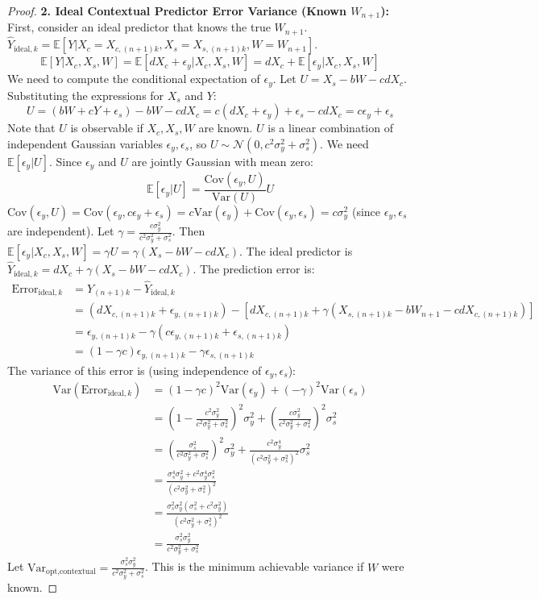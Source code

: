 \documentclass{article}
\theoremstyle{plain}
\theoremstyle{definition}
\theoremstyle{remark}
\newcommand{\E}{\mathbb{E}}
\newcommand{\Var}{\text{Var}}
\newcommand{\Cov}{\text{Cov}}
\newcommand{\N}{\mathcal{N}} %
\begin{document}
\begin{proof}
\textbf{2. Ideal Contextual Predictor Error Variance (Known $W_{n+1}$):}
First, consider an ideal predictor that knows the true $W_{n+1}$.
$\hat{Y}_{\text{ideal}, k} = \E[Y | X_c=X_{c,(n+1)k}, X_s=X_{s,(n+1)k}, W=W_{n+1}]$.
\[
\E[Y | X_c, X_s, W] = \E[dX_c + \epsilon_y | X_c, X_s, W] = dX_c + \E[\epsilon_y | X_c, X_s, W]
\]
We need to compute the conditional expectation of $\epsilon_y$. Let $U = X_s - bW - cdX_c$. Substituting the expressions for $X_s$ and $Y$:
\[
U = (bW + cY + \epsilon_s) - bW - cdX_c = c(dX_c + \epsilon_y) + \epsilon_s - cdX_c = c\epsilon_y + \epsilon_s
\]
Note that $U$ is observable if $X_c, X_s, W$ are known. $U$ is a linear combination of independent Gaussian variables $\epsilon_y, \epsilon_s$, so $U \sim \N(0, c^2\sigma_y^2 + \sigma_s^2)$.
We need $\E[\epsilon_y | U]$. Since $\epsilon_y$ and $U$ are jointly Gaussian with mean zero:
\[
\E[\epsilon_y | U] = \frac{\Cov(\epsilon_y, U)}{\Var(U)} U
\]
$\Cov(\epsilon_y, U) = \Cov(\epsilon_y, c\epsilon_y + \epsilon_s) = c\Var(\epsilon_y) + \Cov(\epsilon_y, \epsilon_s) = c\sigma_y^2$ (since $\epsilon_y, \epsilon_s$ are independent).
Let $\gamma = \frac{c\sigma_y^2}{c^2\sigma_y^2 + \sigma_s^2}$. Then $\E[\epsilon_y | X_c, X_s, W] = \gamma U = \gamma (X_s - bW - cdX_c)$.
The ideal predictor is $\hat{Y}_{\text{ideal}, k} = dX_c + \gamma (X_s - bW - cdX_c)$.
The prediction error is:
\begin{align*}
\text{Error}_{\text{ideal}, k} &= Y_{(n+1)k} - \hat{Y}_{\text{ideal}, k} \\
&= (dX_{c,(n+1)k} + \epsilon_{y,(n+1)k}) - [dX_{c,(n+1)k} + \gamma (X_{s,(n+1)k} - bW_{n+1} - cdX_{c,(n+1)k})] \\
&= \epsilon_{y,(n+1)k} - \gamma (c\epsilon_{y,(n+1)k} + \epsilon_{s,(n+1)k}) \\
&= (1 - \gamma c)\epsilon_{y,(n+1)k} - \gamma \epsilon_{s,(n+1)k}
\end{align*}
The variance of this error is (using independence of $\epsilon_y, \epsilon_s$):
\begin{align*}
\Var(\text{Error}_{\text{ideal}, k}) &= (1 - \gamma c)^2 \Var(\epsilon_y) + (-\gamma)^2 \Var(\epsilon_s) \\
&= \left(1 - \frac{c^2\sigma_y^2}{c^2\sigma_y^2 + \sigma_s^2}\right)^2 \sigma_y^2 + \left(\frac{c\sigma_y^2}{c^2\sigma_y^2 + \sigma_s^2}\right)^2 \sigma_s^2 \\
&= \left(\frac{\sigma_s^2}{c^2\sigma_y^2 + \sigma_s^2}\right)^2 \sigma_y^2 + \frac{c^2\sigma_y^4}{(c^2\sigma_y^2 + \sigma_s^2)^2} \sigma_s^2 \\
&= \frac{\sigma_s^4 \sigma_y^2 + c^2\sigma_y^4 \sigma_s^2}{(c^2\sigma_y^2 + \sigma_s^2)^2} \\
&= \frac{\sigma_s^2 \sigma_y^2 ( \sigma_s^2 + c^2\sigma_y^2 )}{(c^2\sigma_y^2 + \sigma_s^2)^2} \\
&= \frac{\sigma_s^2 \sigma_y^2}{c^2\sigma_y^2 + \sigma_s^2}
\end{align*}
Let $\Var_{\text{opt}, \text{contextual}} = \frac{\sigma_s^2 \sigma_y^2}{c^2\sigma_y^2 + \sigma_s^2}$. This is the minimum achievable variance if $W$ were known.


\end{proof}
\end{document}
